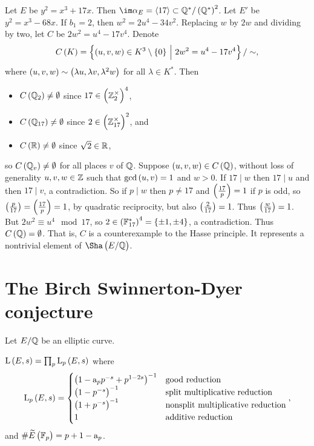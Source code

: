 \begin{example*}[Lind]
Let $ E $ be $ y^2 = x^3 + 17x $. Then $ \im \alpha_E = \abr{17} \subset \QQ^* / \br{\QQ^*}^2 $. Let $ E' $ be $ y^2 = x^3 - 68x $. If $ b_1 = 2 $, then $ w^2 = 2u^4 - 34v^2 $. Replacing $ w $ by $ 2w $ and dividing by two, let $ C $ be $ 2w^2 = u^4 - 17v^4 $. Denote
$$ C\br{K} = \cbr{\br{u, v, w} \in K^3 \setminus \cbr{0} \st 2w^2 = u^4 - 17v^4} / \sim, $$
where $ \br{u, v, w} \sim \br{\lambda u, \lambda v, \lambda^2 w} $ for all $ \lambda \in K^* $. Then
\begin{itemize}
\item $ C\br{\QQ_2} \ne \emptyset $ since $ 17 \in \br{\ZZ_2^\times}^4 $,
\item $ C\br{\QQ_{17}} \ne \emptyset $ since $ 2 \in \br{\ZZ_{17}^\times}^2 $, and
\item $ C\br{\RR} \ne \emptyset $ since $ \sqrt{2} \in \mathbb{R} $,
\end{itemize}
so $ C\br{\QQ_v} \ne \emptyset $ for all places $ v $ of $ \mathbb{Q} $. Suppose $ \br{u, v, w} \in C\br{\QQ} $, without loss of generality $ u, v, w \in \mathbb{Z} $ such that $ \gcd\br{u, v} = 1 $ and $ w > 0 $. If $ 17 \mid w $ then $ 17 \mid u $ and then $ 17 \mid v $, a contradiction. So if $ p \mid w $ then $ p \ne 17 $ and $ \br{\tfrac{17}{p}} = 1 $ if $ p $ is odd, so $ \br{\tfrac{p}{17}} = \br{\tfrac{17}{p}} = 1 $, by quadratic reciprocity, but also $ \br{\tfrac{2}{17}} = 1 $. Thus $ \br{\tfrac{w}{17}} = 1 $. But $ 2w^2 \equiv u^4 \mod 17 $, so $ 2 \in \br{\FF_{17}^*}^4 = \cbr{\pm 1, \pm 4} $, a contradiction. Thus $ C\br{\QQ} = \emptyset $. That is, $ C $ is a counterexample to the Hasse principle. It represents a nontrivial element of $ \Sha\br{E / \QQ} $.
\end{example*}

\pagebreak

\appendix

\section{The Birch Swinnerton-Dyer conjecture}

Let $ E / \mathbb{Q} $ be an elliptic curve.

\begin{definition*}
$ \L\br{E, s} = \prod_p \L_p\br{E, s} $ where
$$ \L_p\br{E, s} =
\begin{cases}
\br{1 - \a_pp^{-s} + p^{1 - 2s}}^{-1} & \text{good reduction} \\
\br{1 - p^{-s}}^{-1} & \text{split multiplicative reduction} \\
\br{1 + p^{-s}}^{-1} & \text{nonsplit multiplicative reduction} \\
1 & \text{additive reduction}
\end{cases},
$$
and $ \#\widetilde{E}\br{\FF_p} = p + 1 - \a_p $.
\end{definition*}

